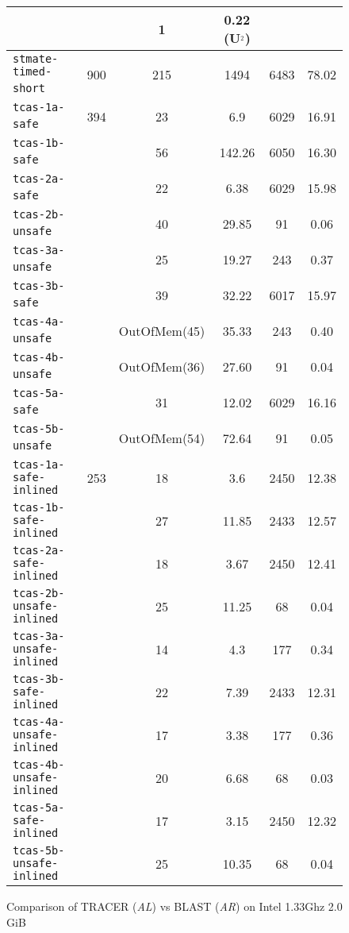 \begin{figure*}[tbh]
\begin{small}
\begin{center}
\begin{tabular}{|l|r||c|c||c|c|}
                 &     &  1       &   0.22 (U$^{_2}$)  &        &           \\ \hline
\texttt{stmate-timed-short}~\cite{malardalenbenchmark}& 900 & 215  &  1494 & 6483   & 78.02     \\ \hline 
\hline
\texttt{tcas-1a-safe}~\cite{BLAST-web}& 394 & 23           & 6.9     & 6029  & 16.91 \\ 
\texttt{tcas-1b-safe}~\cite{BLAST-web}&     & 56           & 142.26  & 6050  & 16.30 \\ 
\texttt{tcas-2a-safe}~\cite{BLAST-web}&     & 22           & 6.38    & 6029  & 15.98 \\ 
\texttt{tcas-2b-unsafe}~\cite{BLAST-web}&     & 40           & 29.85   &  91     & 0.06  \\ 
\texttt{tcas-3a-unsafe}~\cite{BLAST-web}&     & 25           & 19.27   &  243     & 0.37  \\
\texttt{tcas-3b-safe}~\cite{BLAST-web}&     & 39           & 32.22   & 6017  & 15.97 \\ 
\texttt{tcas-4a-unsafe}~\cite{BLAST-web}&     & OutOfMem(45) & 35.33 &  243     & 0.40 \\ 
\texttt{tcas-4b-unsafe}~\cite{BLAST-web}&     & OutOfMem(36) & 27.60 &   91    & 0.04  \\ 
\texttt{tcas-5a-safe}~\cite{BLAST-web}&    & 31           &  12.02& 6029  & 16.16 \\ 
\texttt{tcas-5b-unsafe}~\cite{BLAST-web}&    & OutOfMem(54) & 72.64 &  91     & 0.05  \\ \hline 
\hline
\texttt{tcas-1a-safe-inlined}  & 253 & 18  & 3.6   & 2450  & 12.38 \\ 
\texttt{tcas-1b-safe-inlined}  &     & 27  & 11.85 & 2433  & 12.57 \\ 
\texttt{tcas-2a-safe-inlined}  &     & 18  & 3.67  & 2450  & 12.41 \\ 
\texttt{tcas-2b-unsafe-inlined}  &     & 25  & 11.25 & 68    & 0.04  \\ 
\texttt{tcas-3a-unsafe-inlined}  &     & 14  & 4.3   & 177   & 0.34  \\ 
\texttt{tcas-3b-safe-inlined}  &     & 22  & 7.39  & 2433  & 12.31 \\ 
\texttt{tcas-4a-unsafe-inlined}  &     & 17  & 3.38  & 177   & 0.36  \\ 
\texttt{tcas-4b-unsafe-inlined}  &     & 20  & 6.68  &  68   & 0.03  \\
\texttt{tcas-5a-safe-inlined}  &     & 17  & 3.15  & 2450  & 12.32 \\ 
\texttt{tcas-5b-unsafe-inlined}  &     & 25  & 10.35 &  68   & 0.04  \\ \hline 
\hline
\end{tabular}

\caption{Comparison of TRACER (\emph{AL}) vs BLAST (\emph{AR}) on
  Intel 1.33Ghz 2.0 GiB}
\label{tab:result-1}
\end{center}
\end{small}
\end{figure*}

